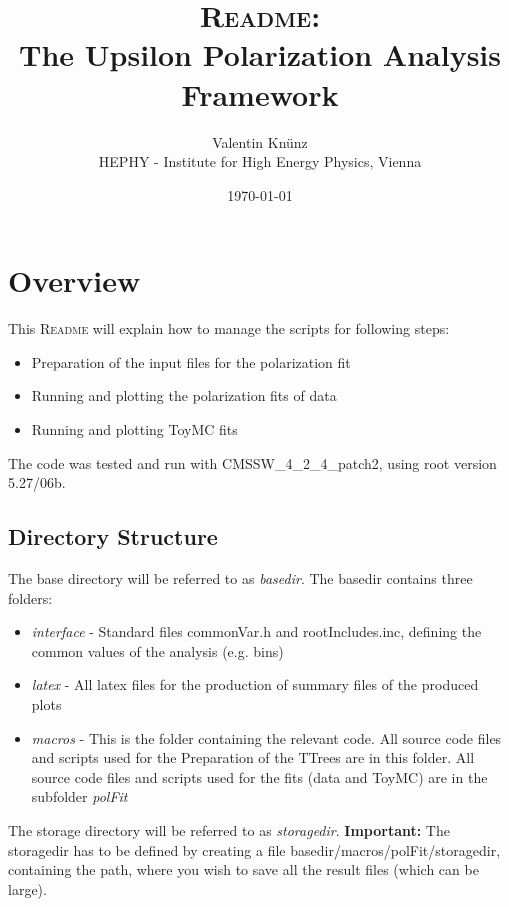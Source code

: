 \documentclass{article}
\begin{document}
\title{\textsc{Readme}:\\The Upsilon Polarization Analysis Framework}
\author{Valentin Kn\"unz\\HEPHY - Institute for High Energy Physics, Vienna}
\date{\today}
\maketitle  


\tableofcontents
\newpage


\section{Overview}

This \textsc{Readme} will explain how to manage the scripts for following steps:
\begin{itemize}
\item{Preparation of the input files for the polarization fit}
\item{Running and plotting the polarization fits of data}
\item{Running and plotting ToyMC fits}
\end{itemize}

The code was tested and run with CMSSW\_4\_2\_4\_patch2, using root version 5.27/06b.

\subsection{Directory Structure}
The base directory will be referred to as \emph{basedir}. The basedir contains three folders:
\begin{itemize}
\item{\emph{interface} - Standard files commonVar.h and rootIncludes.inc, defining the common values of the analysis (e.g. bins)}
\item{\emph{latex} - All latex files for the production of summary files of the produced plots}
\item{\emph{macros} - This is the folder containing the relevant code. All source code files and scripts used for the Preparation of the TTrees are in this folder. All source code files and scripts used for the fits (data and ToyMC) are in the subfolder \emph{polFit}}
\end{itemize}
The storage directory will be referred to as \emph{storagedir}. {\bf Important:} The storagedir has to be defined by creating a file basedir/macros/polFit/storagedir, containing the path, where you wish to save all the result files (which can be large). 
\end{document}
